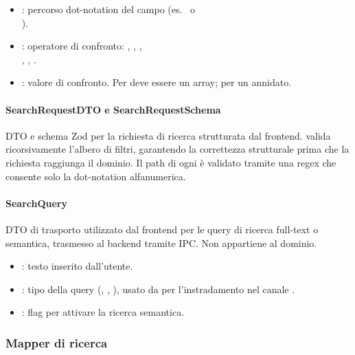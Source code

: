 \begin{itemize}
    \item {} : percorso dot-notation del campo (es.\  o\\).
    \item {} : operatore di confronto: , , ,
    \\, , .
    \item {} : valore di confronto. Per  deve essere un array; per  un  annidato.
\end{itemize}

\paragraph{SearchRequestDTO e SearchRequestSchema}
DTO e schema Zod per la richiesta di ricerca strutturata dal frontend.  valida ricorsivamente l'albero di filtri, garantendo la correttezza 
strutturale prima che la richiesta raggiunga il dominio. Il path di ogni  è validato tramite una regex che consente solo la dot-notation alfanumerica.

\paragraph{SearchQuery}
DTO di trasporto utilizzato dal frontend per le query di ricerca full-text o semantica, trasmesso al backend tramite IPC. Non appartiene al dominio.

\begin{itemize}
    \item {} : testo inserito dall'utente.
    \item {} : tipo della query (, , ), usato da  
    per l'instradamento nel canale .
    \item {} : flag per attivare la ricerca semantica.
\end{itemize}

\subsubsection{Mapper di ricerca}

